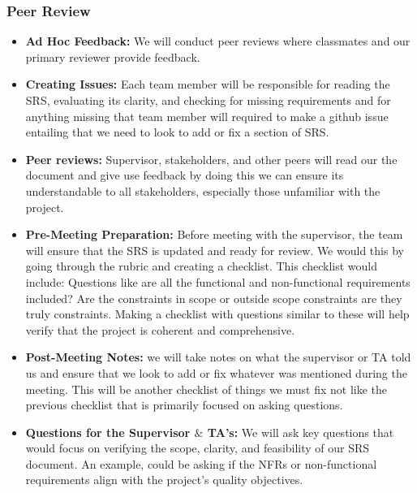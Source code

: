 \documentclass[12pt, titlepage]{article}
\begin{document}
\subsubsection{Peer Review}
\begin{itemize}
    \item \textbf{Ad Hoc Feedback:} We will conduct peer reviews where classmates and our primary reviewer provide feedback. 
    \item \textbf{Creating Issues:} Each team member will be responsible for reading the SRS, evaluating its clarity, and checking for missing requirements and for anything missing that team member will required to make a github issue entailing that we need to look to add or fix a section of SRS. 
    \item \textbf{Peer reviews:} Supervisor, stakeholders, and other peers will read our the document and give use feedback by doing this we can ensure its understandable to all stakeholders, especially those unfamiliar with the project.
    \item \textbf{Pre-Meeting Preparation:} Before meeting with the supervisor, the team will ensure that the SRS is updated and ready for review. We would this by going through the rubric and creating a checklist. This checklist would include: Questions like are all the functional and non-functional requirements included? Are the constraints in scope or outside scope constraints are they truly constraints. Making a checklist with questions similar to these will help verify that the project is coherent and comprehensive.
    \item \textbf{Post-Meeting Notes:} we will take notes on what the supervisor or TA told us and ensure that we look to add or fix whatever was mentioned during the meeting. This will be another checklist of things we must fix not like the previous checklist that is primarily focused on asking questions. 
    \item \textbf{Questions for the Supervisor $\&$ TA's:} We will ask key questions that would focus on verifying the scope, clarity, and feasibility of our SRS document. An example, could be asking if the NFRs or non-functional requirements align with the project’s quality objectives.
\end{itemize}
\end{document}
